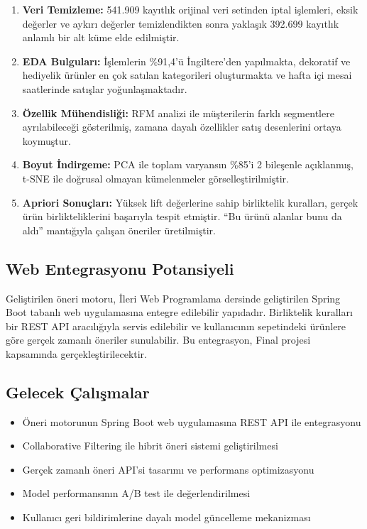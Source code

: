 \documentclass[conference]{IEEEtran}
\begin{document}
\begin{enumerate}[leftmargin=*]
    \item \textbf{Veri Temizleme:} 541.909 kayıtlık orijinal veri setinden iptal işlemleri, eksik değerler ve aykırı değerler temizlendikten sonra yaklaşık 392.699 kayıtlık anlamlı bir alt küme elde edilmiştir.
    
    \item \textbf{EDA Bulguları:} İşlemlerin \%91,4'ü İngiltere'den yapılmakta, dekoratif ve hediyelik ürünler en çok satılan kategorileri oluşturmakta ve hafta içi mesai saatlerinde satışlar yoğunlaşmaktadır.
    
    \item \textbf{Özellik Mühendisliği:} RFM analizi ile müşterilerin farklı segmentlere ayrılabileceği gösterilmiş, zamana dayalı özellikler satış desenlerini ortaya koymuştur.
    
    \item \textbf{Boyut İndirgeme:} PCA ile toplam varyansın \%85'i 2 bileşenle açıklanmış, t-SNE ile doğrusal olmayan kümelenmeler görselleştirilmiştir.
    
    \item \textbf{Apriori Sonuçları:} Yüksek lift değerlerine sahip birliktelik kuralları, gerçek ürün birlikteliklerini başarıyla tespit etmiştir. ``Bu ürünü alanlar bunu da aldı'' mantığıyla çalışan öneriler üretilmiştir.
\end{enumerate}

\subsection{Web Entegrasyonu Potansiyeli}

Geliştirilen öneri motoru, İleri Web Programlama dersinde geliştirilen Spring Boot tabanlı web uygulamasına entegre edilebilir yapıdadır. Birliktelik kuralları bir REST API aracılığıyla servis edilebilir ve kullanıcının sepetindeki ürünlere göre gerçek zamanlı öneriler sunulabilir. Bu entegrasyon, Final projesi kapsamında gerçekleştirilecektir.

\subsection{Gelecek Çalışmalar}

\begin{itemize}[leftmargin=*]
    \item Öneri motorunun Spring Boot web uygulamasına REST API ile entegrasyonu
    \item Collaborative Filtering ile hibrit öneri sistemi geliştirilmesi
    \item Gerçek zamanlı öneri API'si tasarımı ve performans optimizasyonu
    \item Model performansının A/B test ile değerlendirilmesi
    \item Kullanıcı geri bildirimlerine dayalı model güncelleme mekanizması
\end{itemize}
\end{document}

